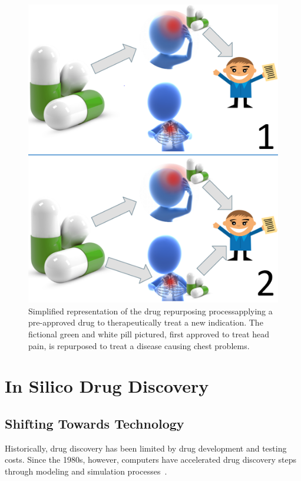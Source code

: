 \documentclass{IEEEtran}
\begin{document}
		\begin{figure}[h]
			\centering
			\includegraphics[width=\linewidth]{repurp}
			\caption{\footnotesize Simplified representation of the drug repurposing process\textemdash applying a pre-approved drug to therapeutically treat a new indication. The fictional green and white pill pictured, first approved to treat head pain, is repurposed to treat a disease causing chest problems.}
			\label{repurp}
		\end{figure} 
	
		\section{In Silico Drug Discovery}
		\subsection{Shifting Towards Technology}
		Historically, drug discovery has been limited by drug development and testing costs. Since the 1980s, however, computers have accelerated drug discovery steps through modeling and simulation processes~\cite{sliwo}.
		
\end{document}
